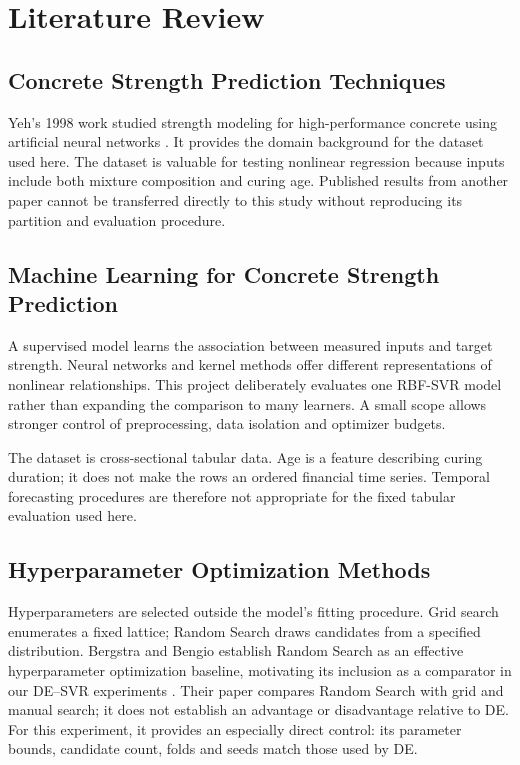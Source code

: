 \chapter{Literature Review}
\section{Concrete Strength Prediction Techniques}
Yeh's 1998 work studied strength modeling for high-performance concrete using artificial neural networks \cite{yeh}. It provides the domain background for the dataset used here. The dataset is valuable for testing nonlinear regression because inputs include both mixture composition and curing age. Published results from another paper cannot be transferred directly to this study without reproducing its partition and evaluation procedure.
\section{Machine Learning for Concrete Strength Prediction}
A supervised model learns the association between measured inputs and target strength. Neural networks and kernel methods offer different representations of nonlinear relationships. This project deliberately evaluates one RBF-SVR model rather than expanding the comparison to many learners. A small scope allows stronger control of preprocessing, data isolation and optimizer budgets.

The dataset is cross-sectional tabular data. Age is a feature describing curing duration; it does not make the rows an ordered financial time series. Temporal forecasting procedures are therefore not appropriate for the fixed tabular evaluation used here.
\section{Hyperparameter Optimization Methods}
Hyperparameters are selected outside the model's fitting procedure. Grid search enumerates a fixed lattice; Random Search draws candidates from a specified distribution. Bergstra and Bengio establish Random Search as an effective hyperparameter optimization baseline, motivating its inclusion as a comparator in our DE--SVR experiments \cite{bergstra}. Their paper compares Random Search with grid and manual search; it does not establish an advantage or disadvantage relative to DE. For this experiment, it provides an especially direct control: its parameter bounds, candidate count, folds and seeds match those used by DE.

